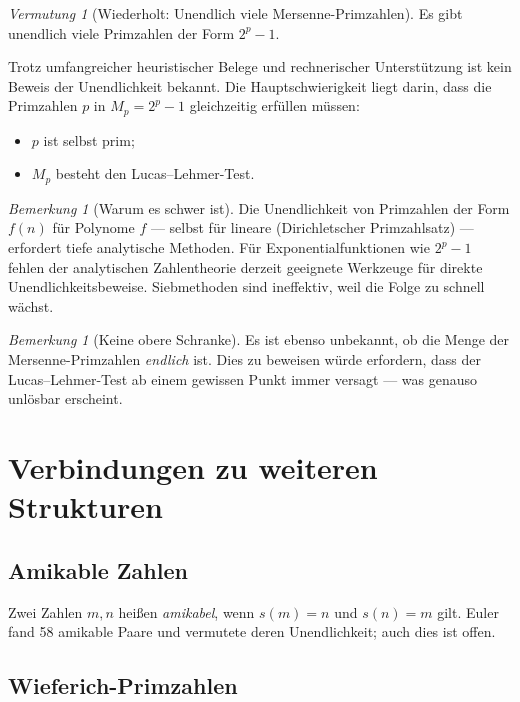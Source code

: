 \documentclass[12pt,a4paper]{amsart}
\theoremstyle{definition}
\theoremstyle{remark}
\newtheorem{bemerkung}[theorem]{Bemerkung}
\newtheorem{vermutung}[theorem]{Vermutung}
\begin{document}
\begin{vermutung}[Wiederholt: Unendlich viele Mersenne-Primzahlen]
Es gibt unendlich viele Primzahlen der Form $2^p - 1$.
\end{vermutung}

Trotz umfangreicher heuristischer Belege und rechnerischer Unterstützung ist
kein Beweis der Unendlichkeit bekannt.
Die Hauptschwierigkeit liegt darin, dass die Primzahlen $p$ in $M_p = 2^p - 1$
gleichzeitig erfüllen müssen:
\begin{itemize}[nosep]
  \item $p$ ist selbst prim;
  \item $M_p$ besteht den Lucas--Lehmer-Test.
\end{itemize}

\begin{bemerkung}[Warum es schwer ist]
Die Unendlichkeit von Primzahlen der Form $f(n)$ für Polynome $f$ --- selbst
für lineare (Dirichletscher Primzahlsatz) --- erfordert tiefe analytische Methoden.
Für Exponentialfunktionen wie $2^p - 1$ fehlen der analytischen Zahlentheorie
derzeit geeignete Werkzeuge für direkte Unendlichkeitsbeweise.
Siebmethoden sind ineffektiv, weil die Folge zu schnell wächst.
\end{bemerkung}

\begin{bemerkung}[Keine obere Schranke]
Es ist ebenso unbekannt, ob die Menge der Mersenne-Primzahlen \emph{endlich}
ist. Dies zu beweisen würde erfordern, dass der Lucas--Lehmer-Test ab einem
gewissen Punkt immer versagt --- was genauso unlösbar erscheint.
\end{bemerkung}

\section{Verbindungen zu weiteren Strukturen}

\subsection{Amikable Zahlen}

Zwei Zahlen $m, n$ heißen \emph{amikabel}, wenn $s(m) = n$ und $s(n) = m$
gilt. Euler fand 58 amikable Paare und vermutete deren Unendlichkeit;
auch dies ist offen.

\subsection{Wieferich-Primzahlen}
\end{document}
